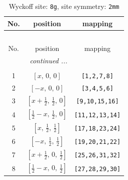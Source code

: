\documentclass[fleqn,8pt]{jsarticle}
\begin{document}
\begin{longtable}{ccc}
\caption{Wyckoff site: {\tt 8g}, site symmetry: {\tt 2mm}}
 \\
 \hline \hline
No. & position & mapping \\ \hline \endfirsthead

\multicolumn{2}{l}{\tablename\ \thetable{}} \\
 \hline \hline
No. & position & mapping \\ \hline \endhead

 \hline \hline
\multicolumn{2}{r}{\footnotesize\it continued ...} \\ \endfoot

 \hline \hline
\multicolumn{2}{r}{} \\ \endlastfoot

1 & $\left[ x,\, 0,\, 0 \right]$ & {\tt [1,2,7,8]} \\ \hline
2 & $\left[ - x,\, 0,\, 0 \right]$ & {\tt [3,4,5,6]} \\ \hline
3 & $\left[ x + \frac{1}{2},\, \frac{1}{2},\, 0 \right]$ & {\tt [9,10,15,16]} \\ \hline
4 & $\left[ \frac{1}{2} - x,\, \frac{1}{2},\, 0 \right]$ & {\tt [11,12,13,14]} \\ \hline
5 & $\left[ x,\, \frac{1}{2},\, \frac{1}{2} \right]$ & {\tt [17,18,23,24]} \\ \hline
6 & $\left[ - x,\, \frac{1}{2},\, \frac{1}{2} \right]$ & {\tt [19,20,21,22]} \\ \hline
7 & $\left[ x + \frac{1}{2},\, 0,\, \frac{1}{2} \right]$ & {\tt [25,26,31,32]} \\ \hline
8 & $\left[ \frac{1}{2} - x,\, 0,\, \frac{1}{2} \right]$ & {\tt [27,28,29,30]} \\
\end{longtable}
\renewcommand{\arraystretch}{1.2}
\end{document}
